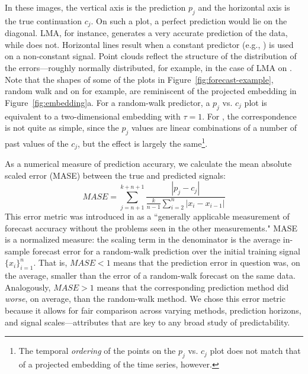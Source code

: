 In these images, the vertical axis is the prediction $p_j$ and the
horizontal axis is the true continuation $c_j$.  On such a plot, a
perfect prediction would lie on the diagonal.  LMA, for instance,
generates a very accurate prediction of the \col data, while \arima
does not.  Horizontal lines result when a constant predictor (e.g.,
\naive) is used on a non-constant signal.  Point clouds reflect the
structure of the distribution of the errors---roughly normally
distributed, for example, in the case of LMA on \gcc.  Note that the
shapes of some of the plots in Figure~\ref{fig:forecast-example}, random walk and \arima on \col for example,  are
reminiscent of the projected embedding in Figure~\ref{fig:embedding}a.
For a random-walk predictor, a $p_j$ vs. $c_j$ plot is equivalent to a
two-dimensional embedding with $\tau=1$.  For \arima, the
correspondence is not quite as simple, since the $p_j$ values are
linear combinations of a number of past values of the $c_j$, but the
effect is largely the same\footnote{The temporal \emph{ordering} of
  the points on the \arima $p_j$ vs. $c_j$ plot does not match that of
  a projected embedding of the time series, however.}.

As a numerical measure of prediction accurary, we calculate the mean
absolute scaled error (MASE) between the true and predicted signals:
%
$$MASE = \sum_{j=n+1}^{k+n+1}\frac{|p_j-c_j|
}{\frac{k}{n-1}\sum^n_{i=2}|x_{i}-x_{i-1}|}$$
%
This error metric was introduced in \cite{MASE} as a ``generally
applicable measurement of forecast accuracy without the problems seen
in the other measurements."  MASE is a normalized measure: the scaling
term in the denominator
%
%
is the average in-sample forecast error for a random-walk prediction
over the initial training signal $\{x_i\}^n_{i=1}$.  That is, $MASE<1$
means that the prediction error in question was, on the average,
smaller than the error of a random-walk forecast on the same data.
Analogously, $MASE>1$ means that the corresponding prediction method
did \emph{worse}, on average, than the random-walk method.  We chose
this error metric because it allows for fair comparison across varying
methods, prediction horizons, and signal scales---attributes that are
key to any broad study of predictability.

